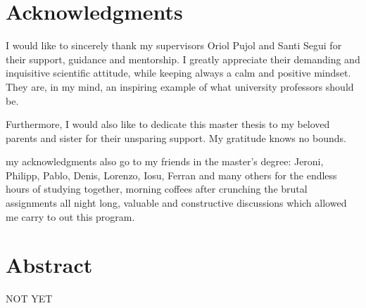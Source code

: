 \documentclass[11pt, oneside]{book}
\begin{document}
%
%
%
\setcounter{page}{3}

\thispagestyle{empty}

\thispagestyle{empty}
\chapter*{Acknowledgments}
\thispagestyle{empty}
I would like to sincerely thank my supervisors Oriol Pujol and Santi Segui for their support, guidance and mentorship. I greatly appreciate their demanding and inquisitive scientific attitude, while keeping always a calm and positive mindset. They are, in my mind, an inspiring example of what university professors should be.

Furthermore, I would also like to dedicate this master thesis to my beloved parents and sister for their unsparing support. My gratitude knows no bounds.

my acknowledgments also go to my friends in the master's degree: Jeroni, Philipp, Pablo, Denis, Lorenzo, Iosu, Ferran and many others for the endless hours of studying together, morning coffees after crunching the brutal assignments all night long, valuable and constructive discussions which allowed me carry to out this program. 
 



\setcounter{page}{0}
\clearpage

\newpage
{} %
\chapter*{Abstract}
\thispagestyle{empty}
NOT YET
\end{document}
